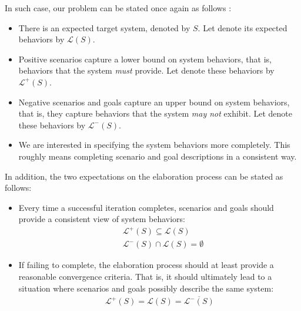 In such case, our problem can be stated once again as follows \cite{Uchitel:2007}:
\begin{itemize}
\item There is an expected target system, denoted by $S$. Let denote its expected behaviors by $\mathcal{L}(S)$.
\item Positive scenarios capture a lower bound on system behaviors, that is, behaviors that the system \emph{must} provide. Let denote these behaviors by $\mathcal{L}^+(S)$.
\item Negative scenarios and goals capture an upper bound on system behaviors, that is, they capture behaviors that the system \emph{may not} exhibit. Let denote these behaviors by $\mathcal{L}^-(S)$.
\item We are interested in specifying the system behaviors more completely. This roughly means completing scenario and goal descriptions in a consistent way.
\end{itemize}

In addition, the two expectations on the elaboration process can be stated as follows:
\begin{itemize}
\item Every time a successful iteration completes, scenarios and goals should provide a consistent view of system behaviors:
\begin{align}
&\mathcal{L}^+(S) \subseteq \mathcal{L}(S)\\
&\mathcal{L}^-(S) \cap \mathcal{L}(S) = \emptyset
\end{align}
\item If failing to complete, the elaboration process should at least provide a reasonable convergence criteria. That is, it should ultimately lead to a situation where scenarios and goals possibly describe the same system:
\begin{align}
\mathcal{L}^+(S) = \mathcal{L}(S) = \overline{\mathcal{L}^-(S)}
\end{align}
\end{itemize}



